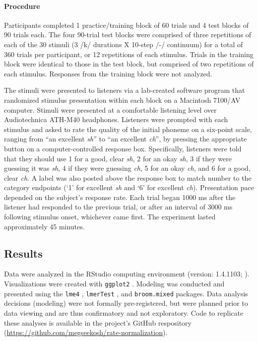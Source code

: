 \documentclass[preprint]{JASA}
\begin{document}
\paragraph{Procedure}

Participants completed 1 practice/training block of 60 trials and 4 test blocks of 90 trials each. The four 90-trial test blocks were comprised of three repetitions of each of the 30 stimuli (3 /k/ durations X 10-step /\textesh-\textteshlig/ continuum) for a total of 360 trials per participant, or 12 repetitions of each stimulus. Trials in the training block were identical to those in the test block, but comprised of two repetitions of each stimulus. Responses from the training block were not analyzed.

The stimuli were presented to listeners via a lab-created software program that randomized stimulus presentation within each block on a Macintosh 7100/AV computer. Stimuli were presented at a comfortable listening level over Audiotechnica ATH-M40 headphones. Listeners were prompted with each stimulus and asked to rate the quality of the initial phoneme on a six-point scale, ranging from ``an excellent \textit{sh}'' to ``an excellent \textit{ch}'', by pressing the appropriate button on a computer-controlled response box. Specifically, listeners were told that they should use 1 for a good, clear \textit{sh}, 2 for an okay \textit{sh}, 3 if they were guessing it was \textit{sh}, 4 if they were guessing \textit{ch}, 5 for an okay \textit{ch}, and 6 for a good, clear \textit{ch}. A label was also posted above the response box to match number to the category endpoints (`1' for excellent \textit{sh} and `6' for excellent \textit{ch}). %
Presentation pace depended on the subject's response rate. Each trial began 1000 ms after the listener had responded to the previous trial, or after an interval of 3000 ms following stimulus onset, whichever came first. The experiment lasted approximately 45 minutes. 

\subsection{Results}

Data were analyzed in the RStudio computing environment (version: 1.4.1103; \citealt{rstudioteamRStudioIntegratedDevelopment2020}). Visualizations were created with \texttt{ggplot2} \citep{wickhamGgplot2ElegantGraphics2016}. Modeling was conducted and presented using the \texttt{lme4} \citep{batesFittingLinearMixedeffects2015}, \texttt{lmerTest} \citep{kuznetsovaLmerTestPackageTests2017}, and \texttt{broom.mixed} \citep{bolkerBroomMixedTidying2020} packages. Data analysis decisions (modeling) were not formally pre-registered, but were planned prior to data viewing and are thus confirmatory and not exploratory. Code to replicate these analyses is available in the project's GitHub respository (\url{https://github.com/megseekosh/rate-normalization}). 
\end{document}
